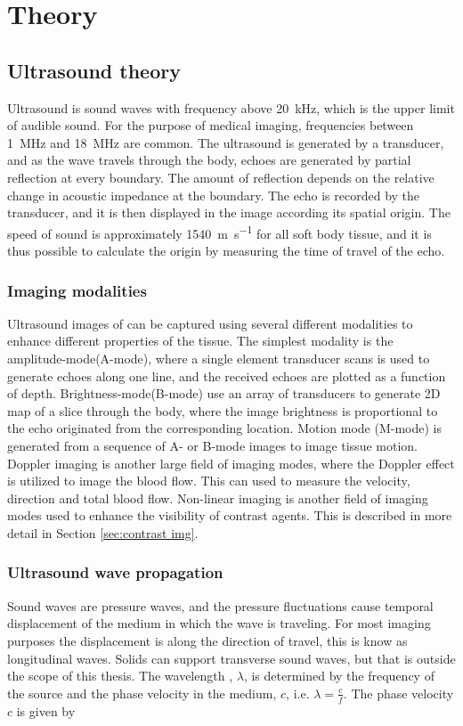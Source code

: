 \section{Theory}
\subsection{Ultrasound theory}
Ultrasound is sound waves with frequency above \SI{20}{\kilo\hertz}, which is the upper limit of audible sound. For the purpose of medical imaging, frequencies between \SI{1}{\mega\hertz} and \SI{18}{\mega\hertz} are common. The ultrasound is generated by a transducer, and as the wave travels through the body, echoes are generated by partial reflection at every boundary. The amount of reflection depends on the relative change in acoustic impedance at the boundary. The echo is recorded by the transducer, and it is then displayed in the image according its spatial origin. The speed of sound is approximately \SI{1540}{\metre\per\second} for all soft body tissue, and it is thus possible to calculate the origin by measuring the time of travel of the echo. 

\subsubsection{Imaging modalities}
Ultrasound images of can be captured using several different modalities to enhance different properties of the tissue. The simplest modality is the amplitude-mode(A-mode), where a single element transducer scans is used to generate echoes along one line, and the received echoes are plotted as a function of depth. Brightness-mode(B-mode) use an array of transducers to generate 2D map of a slice through the body, where the image brightness is proportional to the echo originated from the corresponding location. Motion mode (M-mode) is generated from a sequence of A- or B-mode images to image tissue motion. Doppler imaging is another large field of imaging modes, where the Doppler effect is utilized to image the blood flow. This can used to measure the velocity, direction and total blood flow. Non-linear imaging is another field of imaging modes used to enhance the visibility of contrast agents. This is described in more detail in Section \ref{sec:contrast img}.

\subsubsection{Ultrasound wave propagation}
Sound waves are pressure waves, and the pressure fluctuations cause temporal displacement of the medium in which the wave is traveling. For most imaging purposes the displacement is along the direction of travel, this is know as longitudinal waves. Solids can support transverse sound waves, but that is outside the scope of this thesis.  The wavelength , $\lambda$, is determined by the frequency of the source and the phase velocity in the medium, $c$, i.e. $\lambda= \frac{c}{f}$. The phase velocity $c$ is given by

